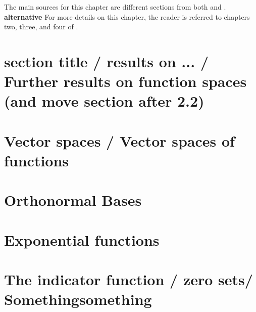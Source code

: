 \documentclass[../thesis.tex]{subfiles}
\begin{document}
The main sources for this chapter are different sections from both \cite{heilMetricsNormsInner2018} and \cite{heilIntroductionRealAnalysis2019}.
\textbf{alternative} For more details on this chapter, the reader is referred to chapters two, three, and four of \cite{heilMetricsNormsInner2018}.

\section{section title / results on ... / Further results on function spaces (and move section after 2.2) }
    

\section{Vector spaces / Vector spaces of functions}
    

\section{Orthonormal Bases}
    

\section{Exponential functions}
    

\section{The indicator function / zero sets/ Somethingsomething}
    
\end{document}
